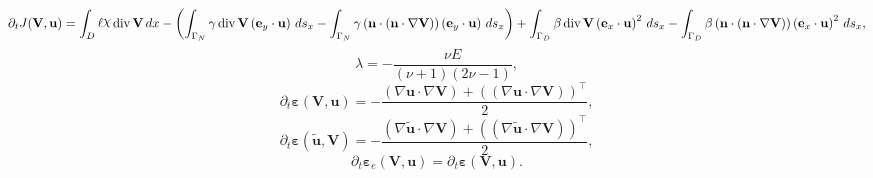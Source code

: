 \documentclass[preview]{standalone}
\let\oldcdot\cdot
\let\cdot\oldcdot
\begin{document}
\begin{dmath*}
\partial_{t} J({\mathbf V},{\mathbf{ u }}) =  \int_{D} \ell \raisebox{\depth}{$\chi$} \operatorname{div} {\mathbf V} \,dx - \left( \int_{\Gamma_N} \gamma \operatorname{div} {\mathbf V} \left( \mathbf e_y \cdot {\mathbf{ u }} \right) \,ds_x -  \int_{\Gamma_N} \gamma \left( \mathbf n \cdot \left( \mathbf n \cdot  \nabla {\mathbf V}  \right) \right) \left( \mathbf e_y \cdot {\mathbf{ u }} \right) \,ds_x\right) +  \int_{\Gamma_D} \beta \operatorname{div} {\mathbf V} \left( \mathbf e_x \cdot {\mathbf{ u }} \right)^{2} \,ds_x -  \int_{\Gamma_D} \beta \left( \mathbf n \cdot \left( \mathbf n \cdot  \nabla {\mathbf V}  \right) \right) \left( \mathbf e_x \cdot {\mathbf{ u }} \right)^{2} \,ds_x,
 \end{dmath*}
\begin{dmath*}
\lambda = - \frac{\nu E}{\left(\nu + 1\right) \left(2 \nu - 1\right)},
 \end{dmath*}
\begin{dmath*}
\partial_{t} \bm\varepsilon({\mathbf V},{\mathbf{ u }}) = - \frac{\left(  \nabla {\mathbf{ u }}  \cdot  \nabla {\mathbf V}  \right) +  \left( \left(  \nabla {\mathbf{ u }}  \cdot  \nabla {\mathbf V}  \right) \right)^\top }{2},
 \end{dmath*}
\begin{dmath*}
\partial_{t} \pmb\varepsilon(\tilde{\mathbf{ u }},{\mathbf V}) = - \frac{\left(  \nabla \tilde{\mathbf{ u }}  \cdot  \nabla {\mathbf V}  \right) +  \left( \left(  \nabla \tilde{\mathbf{ u }}  \cdot  \nabla {\mathbf V}  \right) \right)^\top }{2},
 \end{dmath*}
\begin{dmath*}
\partial_{t} \pmb\varepsilon_e({\mathbf V},{\mathbf{ u }}) = \partial_{t} \bm\varepsilon({\mathbf V},{\mathbf{ u }}).
 \end{dmath*}
\end{document}

